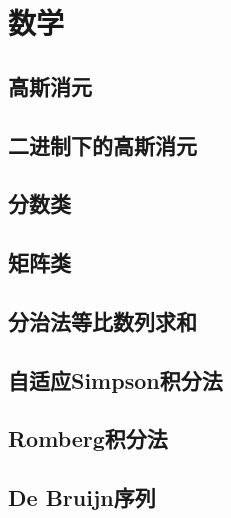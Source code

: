 \section{数学}
\subsection{高斯消元}


\subsection{二进制下的高斯消元}




\subsection{分数类}



\subsection{矩阵类}


\subsection{分治法等比数列求和}



\subsection{自适应Simpson积分法}


\subsection{Romberg积分法}


\subsection{De Bruijn序列}



